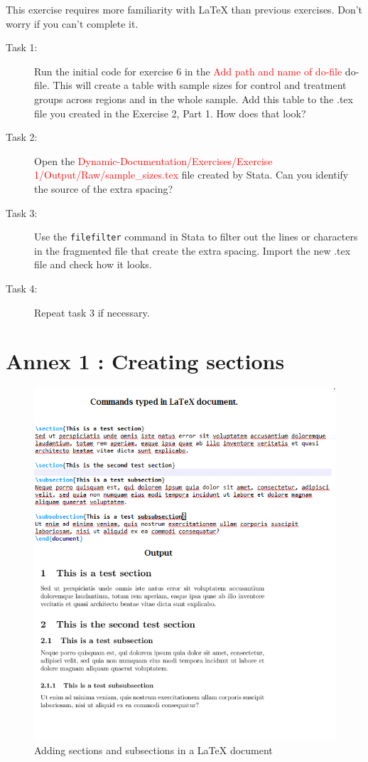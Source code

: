 \documentclass[12pts]{report}
\begin{document}
This exercise requires more familiarity with {\LaTeX} than previous exercises. Don't worry if you can't complete it. 

\begin{description}
	\item[Task 1:] Run the initial code for exercise 6 in the \textcolor{red}{Add path and name of do-file} do-file. This will create a table with sample sizes for control and treatment groups across regions and in the whole sample. Add this table to the .tex file you created in the Exercise 2, Part 1. How does that look?
	\item[Task 2:] Open the \textcolor{red}{Dynamic-Documentation/Exercises/Exercise 1/Output/Raw/sample\_sizes.tex} file created by Stata. Can you identify the source of the extra spacing?
	\item[Task 3:] Use the \texttt{filefilter} command in Stata to filter out the lines or characters in the fragmented file that create the extra spacing. Import the new .tex file and check how it looks.
	\item[Task 4:] Repeat task 3 if necessary.
\end{description}


\newpage
\section*{Annex 1 : Creating sections}
\label{sec:Annex}
\begin{figure}[H]
	\centering
	\includegraphics[width=0.7\linewidth]{../img/section}
	\caption{Adding sections and subsections in a {\LaTeX} document}
	\label{fig:adding sections}
\end{figure}
\end{document}
